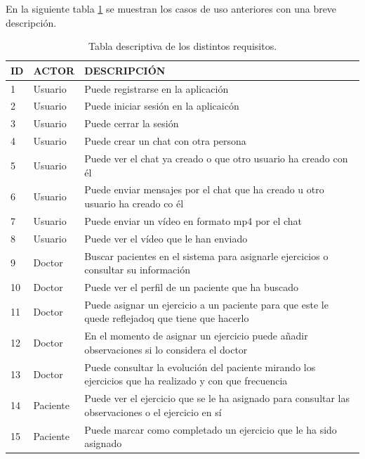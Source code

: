 \medskip
En la siguiente tabla \ref{tabla-requisitos} se muestran los casos de uso anteriores con una breve descripción.
\begin{table}
    \begin{tabular}{|llp{12cm}|}
        \hline
        ID & ACTOR    & DESCRIPCIÓN \\ \hline
        1  & Usuario  & Puede registrarse en la aplicación \\ \hline
        2  & Usuario  & Puede iniciar sesión en la aplicaicón \\ \hline
        3  & Usuario  & Puede cerrar la sesión \\ \hline
        4  & Usuario  & Puede crear un chat con otra persona \\ \hline
        5  & Usuario  & Puede ver el chat ya creado o que otro usuario ha creado con él \\ \hline
        6  & Usuario  & Puede enviar mensajes por el chat que ha creado u otro usuario
        ha creado co él \\ \hline
        7  & Usuario  & Puede enviar un vídeo en formato mp4 por el chat \\ \hline
        8  & Usuario  & Puede ver el vídeo que le han enviado \\ \hline
        9  & Doctor   & Buscar pacientes en el sistema para asignarle ejercicios o
        consultar su información \\ \hline
        10 & Doctor   & Puede ver el perfil de un paciente que ha buscado \\ \hline
        11 & Doctor   & Puede asignar un ejercicio a un paciente para que este le quede
        reflejadoq que tiene que hacerlo \\ \hline
        12 & Doctor   & En el momento de asignar un ejercicio puede añadir observaciones
        si lo considera el doctor \\ \hline
        13 & Doctor   & Puede consultar la evolución del paciente mirando los ejercicios
        que ha realizado y con que frecuencia \\ \hline
        14 & Paciente & Puede ver el ejercicio que se le ha asignado para consultar las
        observaciones o el ejercicio en sí \\ \hline
        15 & Paciente & Puede marcar como completado un ejercicio que le ha sido asignado \\ \hline
    \end{tabular}

    \caption{Tabla descriptiva de los distintos requisitos.}\label{tabla-requisitos}
\end{table}



